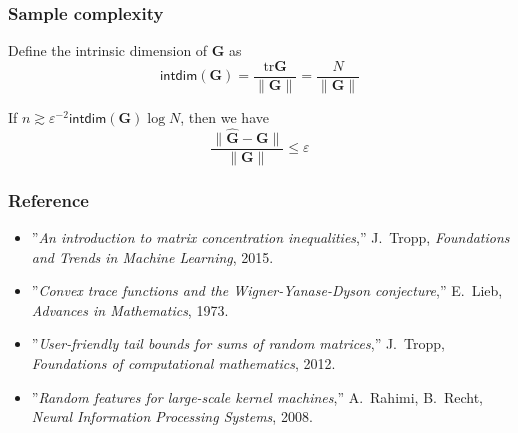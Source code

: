 \documentclass[compress,
mathserif,wide,%
]{beamer}
\begin{document}
\begin{frame}
\frametitle{Sample complexity}

	Define the intrinsic dimension of $\bm{G}$ as 
	\[
		\mathsf{intdim}(\bm{G})= \frac{\mathrm{tr} \bm{G}}{ \|\bm{G} \|} = \frac{N}{\|\bm{G}\|}
	\]

	If $n \gtrsim \varepsilon^{-2} \mathsf{intdim}(\bm{G}) \log N$, then we have
	\[
		\frac{\| \hat{\bm{G}} - \bm{G} \|}{\|\bm{G}\|} \leq \varepsilon
	\]


\end{frame}



\begin{frame}[allowframebreaks]
\frametitle{Reference}

{\small
\begin{itemize}  \itemsep0.3em
  \item ''\textit{An introduction to matrix concentration inequalities},'' J.~Tropp, \textit{Foundations and Trends in Machine Learning}, 2015.
  \item ''\textit{Convex trace functions and the Wigner-Yanase-Dyson conjecture},'' E.~Lieb, \textit{Advances in Mathematics}, 1973.
  \item ''\textit{User-friendly tail bounds for sums of random matrices},'' J.~Tropp, \textit{Foundations of computational mathematics}, 2012.
  \item ''\textit{Random features for large-scale kernel machines},'' A.~Rahimi, B.~Recht, \textit{Neural Information Processing Systems}, 2008.  


\end{itemize}
}


\end{frame}
\end{document}
